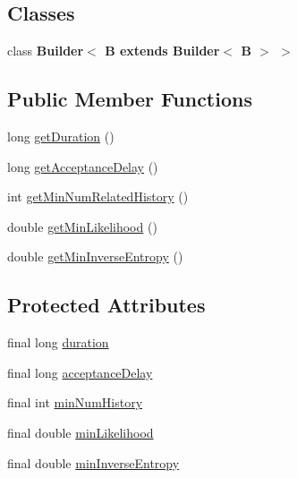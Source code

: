 \subsection*{\-Classes}
\begin{DoxyCompactItemize}
\item 
class {\bfseries \-Builder$<$ B extends Builder$<$ B $>$ $>$}
\end{DoxyCompactItemize}
\subsection*{\-Public \-Member \-Functions}
\begin{DoxyCompactItemize}
\item 
long \hyperlink{classlab_1_1davidahn_1_1appshuttle_1_1predict_1_1matcher_1_1_base_matcher_conf_a5669ae3444c5145416176b1726b51c98}{get\-Duration} ()
\item 
long \hyperlink{classlab_1_1davidahn_1_1appshuttle_1_1predict_1_1matcher_1_1_base_matcher_conf_adee1cf0e30f31640503d3f4b84a60b14}{get\-Acceptance\-Delay} ()
\item 
int \hyperlink{classlab_1_1davidahn_1_1appshuttle_1_1predict_1_1matcher_1_1_base_matcher_conf_a56cdabe67b20f69e6474c31ce2e0654e}{get\-Min\-Num\-Related\-History} ()
\item 
double \hyperlink{classlab_1_1davidahn_1_1appshuttle_1_1predict_1_1matcher_1_1_base_matcher_conf_a00680a8d2ac21dd859dd6e722a634144}{get\-Min\-Likelihood} ()
\item 
double \hyperlink{classlab_1_1davidahn_1_1appshuttle_1_1predict_1_1matcher_1_1_base_matcher_conf_af60bea978a2c3f953ef723dc7ee95fd9}{get\-Min\-Inverse\-Entropy} ()
\end{DoxyCompactItemize}
\subsection*{\-Protected \-Attributes}
\begin{DoxyCompactItemize}
\item 
final long \hyperlink{classlab_1_1davidahn_1_1appshuttle_1_1predict_1_1matcher_1_1_base_matcher_conf_a885c5754c624276a3618af9d284777e7}{duration}
\item 
final long \hyperlink{classlab_1_1davidahn_1_1appshuttle_1_1predict_1_1matcher_1_1_base_matcher_conf_aa4fb1da38efb88cdd3b088aa4ace4a6b}{acceptance\-Delay}
\item 
final int \hyperlink{classlab_1_1davidahn_1_1appshuttle_1_1predict_1_1matcher_1_1_base_matcher_conf_a5249864474dc7b468f2840354ee31689}{min\-Num\-History}
\item 
final double \hyperlink{classlab_1_1davidahn_1_1appshuttle_1_1predict_1_1matcher_1_1_base_matcher_conf_aaa44f0af05066d7fde822700d845be29}{min\-Likelihood}
\item 
final double \hyperlink{classlab_1_1davidahn_1_1appshuttle_1_1predict_1_1matcher_1_1_base_matcher_conf_a3338fe8b2a1f0efc2732e34264c28fd4}{min\-Inverse\-Entropy}
\end{DoxyCompactItemize}
